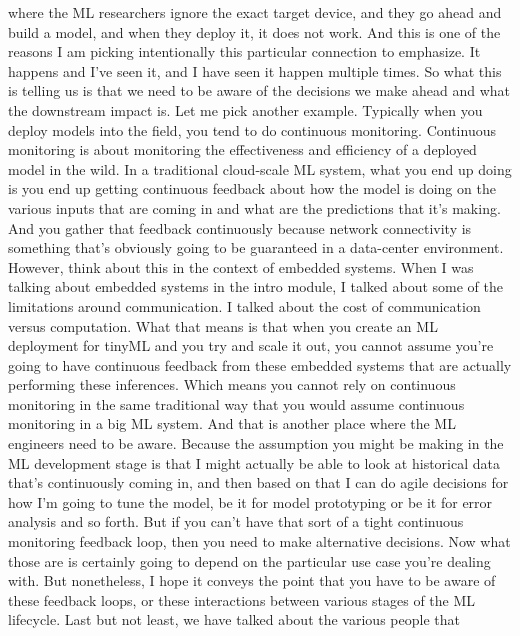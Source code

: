 {{    where the ML researchers ignore the exact target device, and they go ahead
    and build a model, and when they deploy it, it does not work.
    And this is one of the reasons I am picking intentionally
    this particular connection to emphasize.
    It happens and I've seen it, and I have seen it happen multiple times.
    So what this is telling us is that we need to be aware of the decisions
    we make ahead and what the downstream impact is.
    Let me pick another example.
    Typically when you deploy models into the field,
    you tend to do continuous monitoring.
    Continuous monitoring is about monitoring
    the effectiveness and efficiency of a deployed model in the wild.
    In a traditional cloud-scale ML system, what you end up doing is
    you end up getting continuous feedback about how
    the model is doing on the various inputs that are coming in
    and what are the predictions that it's making.
    And you gather that feedback continuously
    because network connectivity is something
    that's obviously going to be guaranteed in a data-center environment.
    However, think about this in the context of embedded systems.
    When I was talking about embedded systems in the intro module,
    I talked about some of the limitations around communication.
    I talked about the cost of communication versus computation.
    What that means is that when you create an ML deployment for tinyML and you try
    and scale it out, you cannot assume you're going to have continuous
    feedback from these embedded systems that are actually performing these
    inferences.
    Which means you cannot rely on continuous monitoring in the same
    traditional way that you would assume continuous monitoring in a big ML
    system.
    And that is another place where the ML engineers need to be aware.
    Because the assumption you might be making in the ML development stage
    is that I might actually be able to look at historical data that's continuously
    coming in, and then based on that I can do agile decisions for how
    I'm going to tune the model, be it for model prototyping
    or be it for error analysis and so forth.
    But if you can't have that sort of a tight continuous monitoring feedback
    loop, then you need to make alternative decisions.
    Now what those are is certainly going to depend on the particular use case
    you're dealing with.
    But nonetheless, I hope it conveys the point that you have to be aware
    of these feedback loops, or these interactions between various stages
    of the ML lifecycle.
    Last but not least, we have talked about the various people that
}}
